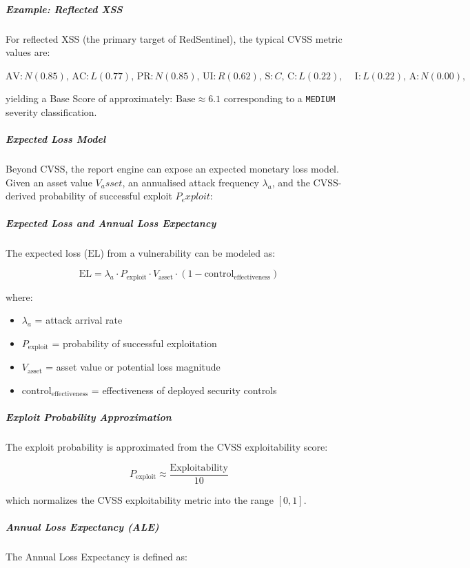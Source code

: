 \subparagraph*{Example: Reflected XSS}

For reflected XSS (the primary target of RedSentinel), the typical CVSS metric values are:


$
\mathrm{AV} : N  (0.85)\text{, } 
\mathrm{AC} : L  (0.77) \text{, }
\mathrm{PR} : N  (0.85) \text{, }
\mathrm{UI} : R  (0.62) \text{, }
\mathrm{S}  : C \text{, }
\mathrm{C}  : L  (0.22)
\text{, } \quad
\mathrm{I}  : L  (0.22)\text{, }
\mathrm{A}  : N  (0.00)\text{, }
$


yielding a Base Score of approximately: $\mathrm{Base} \approx 6.1$ corresponding to a \texttt{MEDIUM} severity classification.
\subparagraph*{Expected Loss Model}
Beyond CVSS, the report engine can expose an expected monetary loss model. Given an asset value $V_asset$, an annualised attack frequency $\lambda_a$, and the CVSS-derived probability of successful exploit $P_exploit$:

\subparagraph*{Expected Loss and Annual Loss Expectancy}

The expected loss (\(\mathrm{EL}\)) from a vulnerability can be modeled as:

\[
\mathrm{EL}
=
\lambda_a
\cdot
P_{\mathrm{exploit}}
\cdot
V_{\mathrm{asset}}
\cdot
(1-\mathrm{control}_{\mathrm{effectiveness}})
\]

where:

\begin{itemize}
    \item \(\lambda_a\) = attack arrival rate
    \item \(P_{\mathrm{exploit}}\) = probability of successful exploitation
    \item \(V_{\mathrm{asset}}\) = asset value or potential loss magnitude
    \item \(\mathrm{control}_{\mathrm{effectiveness}}\) = effectiveness of deployed security controls
\end{itemize}

\subparagraph*{Exploit Probability Approximation}

The exploit probability is approximated from the CVSS exploitability score:

\[
P_{\mathrm{exploit}}
\approx
\frac{\mathrm{Exploitability}}{10}
\]

which normalizes the CVSS exploitability metric into the range \([0,1]\).

\subparagraph*{Annual Loss Expectancy (ALE)}

The Annual Loss Expectancy is defined as:

